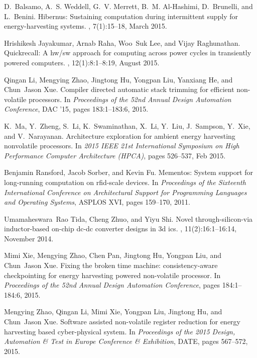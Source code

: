 

%
\begin{thebibliography}{1}

D.~Balsamo, A.~S. Weddell, G.~V. Merrett, B.~M. Al-Hashimi, D.~Brunelli, and
  L.~Benini.
\newblock Hibernus: Sustaining computation during intermittent supply for
  energy-harvesting systems.
, 7(1):15--18, March 2015.

Hrishikesh Jayakumar, Arnab Raha, Woo~Suk Lee, and Vijay Raghunathan.
\newblock Quickrecall: A hw/sw approach for computing across power cycles in
  transiently powered computers.
, 12(1):8:1--8:19, August 2015.

Qingan Li, Mengying Zhao, Jingtong Hu, Yongpan Liu, Yanxiang He, and Chun~Jason
  Xue.
\newblock Compiler directed automatic stack trimming for efficient non-volatile
  processors.
\newblock In {\em Proceedings of the 52nd Annual Design Automation Conference},
  DAC '15, pages 183:1--183:6, 2015.

K.~Ma, Y.~Zheng, S.~Li, K.~Swaminathan, X.~Li, Y.~Liu, J.~Sampson, Y.~Xie, and
  V.~Narayanan.
\newblock Architecture exploration for ambient energy harvesting nonvolatile
  processors.
\newblock In {\em 2015 IEEE 21st International Symposium on High Performance
  Computer Architecture (HPCA)}, pages 526--537, Feb 2015.

Benjamin Ransford, Jacob Sorber, and Kevin Fu.
\newblock Mementos: System support for long-running computation on rfid-scale
  devices.
\newblock In {\em Proceedings of the Sixteenth International Conference on
  Architectural Support for Programming Languages and Operating Systems},
  ASPLOS XVI, pages 159--170, 2011.

Umamaheswara~Rao Tida, Cheng Zhuo, and Yiyu Shi.
\newblock Novel through-silicon-via inductor-based on-chip dc-dc converter
  designs in 3d ics.
, 11(2):16:1--16:14, November
  2014.

Mimi Xie, Mengying Zhao, Chen Pan, Jingtong Hu, Yongpan Liu, and Chun~Jason
  Xue.
\newblock Fixing the broken time machine: consistency-aware checkpointing for
  energy harvesting powered non-volatile processor.
\newblock In {\em Proceedings of the 52nd Annual Design Automation Conference},
  pages 184:1--184:6, 2015.

Mengying Zhao, Qingan Li, Mimi Xie, Yongpan Liu, Jingtong Hu, and Chun~Jason
  Xue.
\newblock Software assisted non-volatile register reduction for energy
  harvesting based cyber-physical system.
\newblock In {\em Proceedings of the 2015 Design, Automation \& Test in Europe
  Conference \& Exhibition}, DATE, pages 567--572, 2015.

\end{thebibliography}

